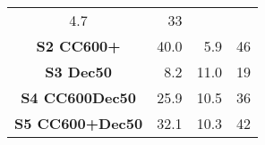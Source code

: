 \begin{longtable}[]{@{}crrr@{}}
\begin{minipage}[t]{0.30\columnwidth}
4.7\strut
\end{minipage} & \begin{minipage}[t]{0.09\columnwidth}\raggedleft\strut
33\strut
\end{minipage}\tabularnewline
\begin{minipage}[t]{0.26\columnwidth}\centering\strut
\textbf{S2 CC600+}\strut
\end{minipage} & \begin{minipage}[t]{0.17\columnwidth}\raggedleft\strut
40.0\strut
\end{minipage} & \begin{minipage}[t]{0.30\columnwidth}\raggedleft\strut
5.9\strut
\end{minipage} & \begin{minipage}[t]{0.09\columnwidth}\raggedleft\strut
46\strut
\end{minipage}\tabularnewline
\begin{minipage}[t]{0.26\columnwidth}\centering\strut
\textbf{S3 Dec50}\strut
\end{minipage} & \begin{minipage}[t]{0.17\columnwidth}\raggedleft\strut
8.2\strut
\end{minipage} & \begin{minipage}[t]{0.30\columnwidth}\raggedleft\strut
11.0\strut
\end{minipage} & \begin{minipage}[t]{0.09\columnwidth}\raggedleft\strut
19\strut
\end{minipage}\tabularnewline
\begin{minipage}[t]{0.26\columnwidth}\centering\strut
\textbf{S4 CC600Dec50}\strut
\end{minipage} & \begin{minipage}[t]{0.17\columnwidth}\raggedleft\strut
25.9\strut
\end{minipage} & \begin{minipage}[t]{0.30\columnwidth}\raggedleft\strut
10.5\strut
\end{minipage} & \begin{minipage}[t]{0.09\columnwidth}\raggedleft\strut
36\strut
\end{minipage}\tabularnewline
\begin{minipage}[t]{0.26\columnwidth}\centering\strut
\textbf{S5 CC600+Dec50}\strut
\end{minipage} & \begin{minipage}[t]{0.17\columnwidth}\raggedleft\strut
32.1\strut
\end{minipage} & \begin{minipage}[t]{0.30\columnwidth}\raggedleft\strut
10.3\strut
\end{minipage} & \begin{minipage}[t]{0.09\columnwidth}\raggedleft\strut
42\strut
\end{minipage}\tabularnewline
\bottomrule
\end{longtable}